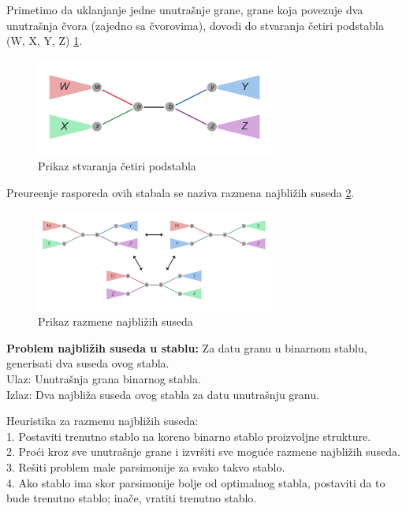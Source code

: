 Primetimo da uklanjanje jedne unutra\v{s}nje grane, grane koja povezuje dva unutra\v{s}nja \v{c}vora (zajedno sa \v{c}vorovima), dovodi do stvaranja \v{c}etiri podstabla (W, X, Y, Z) \ref{fig:pscp}.

\begin{figure}[h!]
\begin{center}
\includegraphics[width=0.7\textwidth]{poglavlja/7/slike/slika8.png}
\end{center}
\caption{Prikaz stvaranja \v{c}etiri podstabla}
\label{fig:pscp}
\end{figure}

Preure\dj enje rasporeda ovih stabala se naziva razmena najbli\v{z}ih suseda \ref{fig:psns}.

\begin{figure}[h!]
\begin{center}
\includegraphics[width=0.7\textwidth]{poglavlja/7/slike/slika9.png}
\end{center}
\caption{Prikaz razmene najbli\v{z}ih suseda}
\label{fig:psns}
\end{figure}

\begin{tcolorbox}
\textbf{Problem najbli\v{z}ih suseda u stablu:} Za datu granu u binarnom stablu, generisati dva suseda ovog stabla. \\
Ulaz: Unutra\v{s}nja grana binarnog stabla.\\
Izlaz: Dva najbli\v{z}a suseda ovog stabla za datu unutra\v{s}nju granu.
\end{tcolorbox}

Heuristika za razmenu najbli\v{z}ih suseda:\\
1. Postaviti trenutno stablo na koreno binarno stablo proizvoljne strukture.\\
2. Pro\'ci kroz sve unutra\v{s}nje grane i izvr\v{s}iti sve mogu\'ce razmene najbli\v{z}ih suseda.\\
3. Re\v{s}iti problem male parsimonije za svako takvo stablo.\\
4. Ako stablo ima skor parsimonije bolje od optimalnog stabla, postaviti da to bude trenutno stablo; ina\v{c}e, vratiti trenutno stablo.


